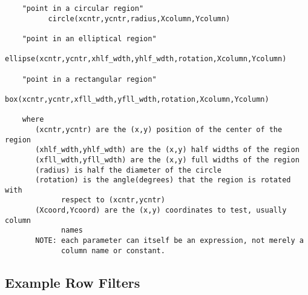 \documentclass[11pt]{book}
\begin{document}
\begin{verbatim}
    "point in a circular region"
          circle(xcntr,ycntr,radius,Xcolumn,Ycolumn)

    "point in an elliptical region"
         ellipse(xcntr,ycntr,xhlf_wdth,yhlf_wdth,rotation,Xcolumn,Ycolumn)

    "point in a rectangular region"
             box(xcntr,ycntr,xfll_wdth,yfll_wdth,rotation,Xcolumn,Ycolumn)

    where
       (xcntr,ycntr) are the (x,y) position of the center of the region
       (xhlf_wdth,yhlf_wdth) are the (x,y) half widths of the region
       (xfll_wdth,yfll_wdth) are the (x,y) full widths of the region
       (radius) is half the diameter of the circle
       (rotation) is the angle(degrees) that the region is rotated with
             respect to (xcntr,ycntr)
       (Xcoord,Ycoord) are the (x,y) coordinates to test, usually column
             names
       NOTE: each parameter can itself be an expression, not merely a
             column name or constant.
\end{verbatim}


\subsection{Example Row Filters}
\end{document}
